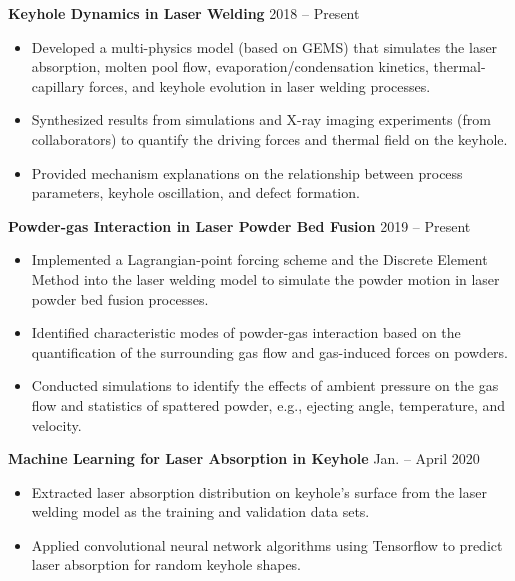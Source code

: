 \documentclass[11pt, letterpaper]{article}
\begin{document}
\textbf{Keyhole Dynamics in Laser Welding} \hfill 2018 -- Present
\begin{itemize}[leftmargin=*, labelsep=5mm]
   \item Developed a multi-physics model (based on GEMS) that simulates the laser absorption, molten
      pool flow, evaporation/condensation kinetics, thermal-capillary forces, and keyhole evolution
      in laser welding processes.
   \item Synthesized results from simulations and X-ray imaging experiments (from collaborators) to
      quantify the driving forces and thermal field on the keyhole.
   \item Provided mechanism explanations on the relationship between process parameters, keyhole
      oscillation, and defect formation.
\end{itemize}

\vspace{3pt}
\textbf{Powder-gas Interaction in Laser Powder Bed Fusion} \hfill 2019 -- Present
\begin{itemize}[leftmargin=*, labelsep=5mm]
   \item Implemented a Lagrangian-point forcing scheme and the Discrete Element Method
      into the laser welding model to simulate the powder motion in laser powder bed fusion
      processes.
   \item Identified characteristic modes of powder-gas interaction based on the quantification of
      the surrounding gas flow and gas-induced forces on powders.
   \item Conducted simulations to identify the effects of ambient pressure on the gas flow and
      statistics of spattered powder, e.g., ejecting angle, temperature, and velocity.
\end{itemize}

\vspace{3pt}

\textbf{Machine Learning for Laser Absorption in Keyhole} \hfill Jan. -- April 2020
\begin{itemize}[leftmargin=*, labelsep=5mm]
   \item Extracted laser absorption distribution on keyhole's surface from the laser welding
      model as the training and validation data sets.
   \item Applied convolutional neural network algorithms using Tensorflow to predict laser
      absorption for random keyhole shapes.
\end{itemize}
\end{document}
